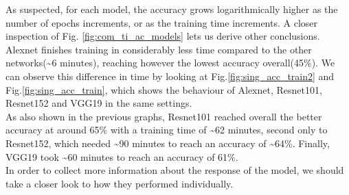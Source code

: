 As suspected, for each model, the accuracy grows logarithmically higher as the number of  epochs increments, or as the training time increments. A closer inspection of Fig. \ref{fig:com_ti_ac_models} lets us derive other conclusions. Alexnet finishes training in considerably less time compared to the other networks(\textasciitilde 6 minutes), reaching however the lowest accuracy overall(45\%). We can observe this difference in time by looking at Fig.\ref{fig:sing_acc_train2} and Fig.\ref{fig:sing_acc_train}, which shows the behaviour of Alexnet, Resnet101, Resnet152 and VGG19 in the same settings. \\
As also shown in the previous graphs, Resnet101 reached overall the better accuracy at around 65\% with a training time of \textasciitilde 62 minutes, second only to Resnet152, which needed  \textasciitilde 90 minutes to reach an accuracy of \textasciitilde 64\%. Finally, VGG19 took \textasciitilde 60 minutes to reach an accuracy of 61\%. \\
In order to collect more information about the response of the model, we should take a closer look to how they performed individually.\\

